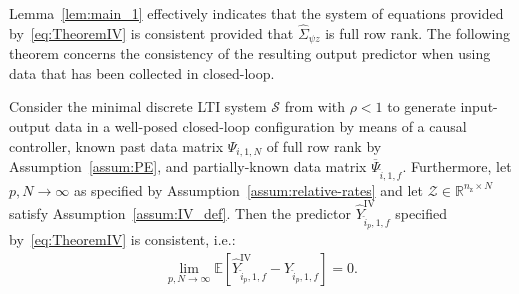Lemma~\ref{lem:main_1} effectively indicates that the system of equations provided by~\eqref{eq:TheoremIV} is consistent provided that $\hat{\Sigma}_{\psi z}$ is full row rank. The following theorem concerns the consistency of the resulting output predictor when using data that has been collected in closed-loop.
\setcounter{thm}{0}
\begin{thm}\label{theorem:main_result_IVs}
    Consider the minimal discrete \ac{LTI} system $\mathcal{S}$ from  with $\rho<1$ to generate input-output data in a well-posed closed-loop configuration by means of a causal controller, known past data matrix $\Psi_{i,1,N}$ of full row rank by Assumption~\ref{assum:PE}, and partially-known data matrix $\overline{\Psi}_{\hat{i},1,f}$. Furthermore, let $p,N\rightarrow\infty$ as specified by Assumption~\ref{assum:relative-rates} and let ${\mathcal{Z}\in\mathbb{R}^{n_\mathrm{z}\times N}}$ satisfy Assumption~\ref{assum:IV_def}. Then the predictor $\widehat{Y}_{\hat{i}_p,1,f}^\mathrm{IV}$ specified by~\eqref{eq:TheoremIV} is consistent, i.e.:
    \begin{align}\label{eq:consistent}
    \lim_{p,N\rightarrow\infty}\mathbb{E}\left[\widehat{Y}_{\hat{i}_p,1,f}^\mathrm{IV}-Y_{\hat{i}_p,1,f}\right]=0.
    \end{align}
\end{thm}
%
